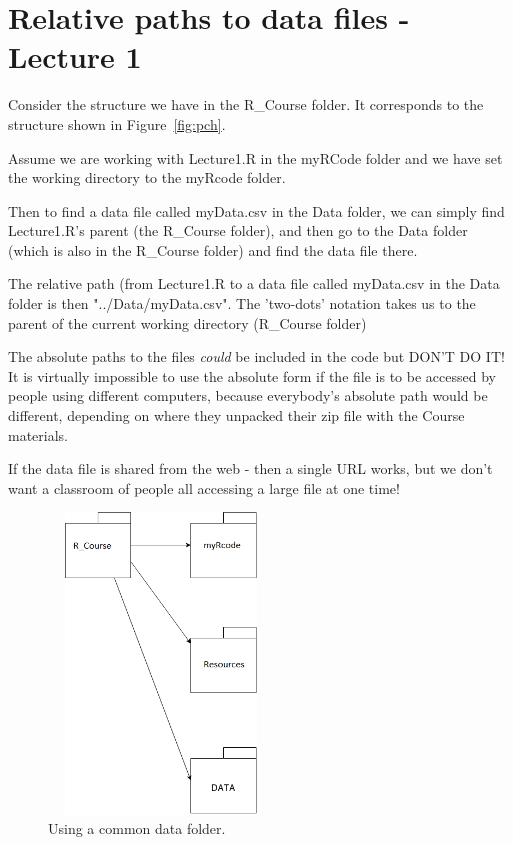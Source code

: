 \documentclass[titlepage]{book}\usepackage{knitr}
\begin{document}
\section{Relative paths to data files - Lecture 1}\label{DataStructure}

Consider the structure we have in the R\_Course folder.  It corresponds to the structure shown in Figure~\ref{fig:pch}. 

Assume we are working with Lecture1.R in the myRCode folder and we have set the working directory to the myRcode folder.  

Then to find a data file called myData.csv in the Data folder, we can simply find Lecture1.R's parent (the R\_Course folder), and then go to the Data folder (which is also in the R\_Course folder) and find the data file there. 

The relative path (from Lecture1.R to a data file called myData.csv in the Data folder is then "../Data/myData.csv". The 'two-dots' notation takes us to the parent of the current working directory (R\_Course folder)

The absolute paths to the files \emph{could} be included in the code but DON'T DO IT!  It is virtually impossible to use the absolute form if the file is to be accessed by people using different computers, because everybody's absolute  path would be different, depending on where they unpacked their zip file with the Course materials.

If the data file is shared from the web - then a single URL works, but we don't want a classroom of people all accessing a large file at one time!



\begin{figure}[!ht]
\graphicspath{{./Images/}}
\includegraphics[width=6cm, height = 8cm]{dataFolder2.png}
\caption{Using a common data folder.}
\label{fig:folder_struct}
\end{figure}
\end{document}
